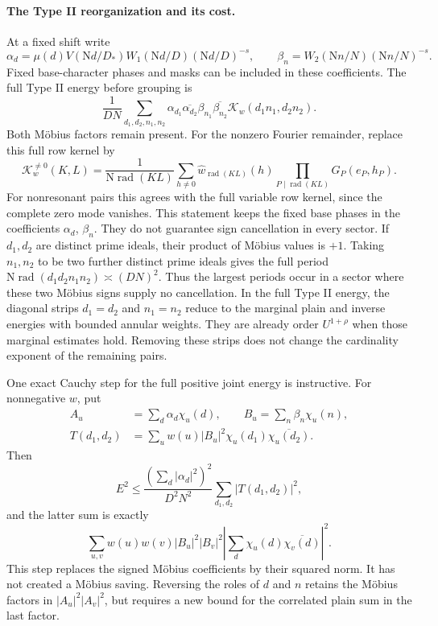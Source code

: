 \documentclass[11pt]{article}
\newcommand{\Nm}{\mathrm N}
\newcommand{\rad}{\operatorname{rad}}
\begin{document}
\paragraph{The Type II reorganization and its cost.}
At a fixed shift write
\[
 \alpha_d=\mu(d)V(\Nm d/D_*)W_1(\Nm d/D)(\Nm d/D)^{-s},
 \qquad \beta_n=W_2(\Nm n/N)(\Nm n/N)^{-s}.
\]
Fixed base-character phases and masks can be included in these
coefficients. The full Type II energy before grouping is
\[
 \frac1{DN}\sum_{d_1,d_2,n_1,n_2}
 \alpha_{d_1}\overline{\alpha_{d_2}}
 \beta_{n_1}\overline{\beta_{n_2}}
 \mathcal K_w(d_1n_1,d_2n_2).
\]
Both M\"obius factors remain present.
For the nonzero Fourier remainder, replace this full row kernel by
\[
 \mathcal K_w^{\ne0}(K,L)=
   \frac1{\Nm\rad(KL)}\sum_{h\ne0}
      \widehat w_{\rad(KL)}(h)\prod_{P\mid\rad(KL)}G_P(e_P,h_P).
\]
For nonresonant pairs this agrees with the full variable row kernel,
since the complete zero mode vanishes. This statement keeps the
fixed base phases in the coefficients \(\alpha_d\), \(\beta_n\).
They do not guarantee sign cancellation in every sector.
If \(d_1,d_2\) are distinct prime ideals, their product of M\"obius
values is \(+1\). Taking \(n_1,n_2\) to be two further distinct
prime ideals gives the full period \(\Nm\rad(d_1d_2n_1n_2)\asymp
(DN)^2\). Thus the largest periods occur in a sector where these
two M\"obius signs supply no cancellation.
In the full Type II energy, the diagonal strips \(d_1=d_2\) and
\(n_1=n_2\) reduce to the
marginal plain and inverse energies with bounded annular weights.
They are already order \(U^{1+\rho}\) when those marginal estimates
hold. Removing these strips does not change the cardinality exponent
of the remaining pairs.

One exact Cauchy step for the full positive joint energy is instructive.
For nonnegative \(w\), put
\[
 \begin{aligned}
 A_u&=\sum_d\alpha_d\chi_u(d),\qquad
 B_u=\sum_n\beta_n\chi_u(n),\\
 T(d_1,d_2)&=\sum_u w(u)|B_u|^2
                \chi_u(d_1)\overline{\chi_u(d_2)}.
 \end{aligned}
\]
Then
\[
 E^2\le\frac{(\sum_d|\alpha_d|^2)^2}{D^2N^2}
          \sum_{d_1,d_2}|T(d_1,d_2)|^2,
\]
and the latter sum is exactly
\[
 \sum_{u,v}w(u)w(v)|B_u|^2|B_v|^2
 \left|\sum_d\chi_u(d)\overline{\chi_v(d)}\right|^2.
\]
This step replaces the signed M\"obius coefficients by their squared
norm. It has not created a M\"obius saving. Reversing the roles of
\(d\) and \(n\) retains the M\"obius factors in \(|A_u|^2|A_v|^2\),
but requires a new bound for the correlated plain sum in the last
factor.
\end{document}
